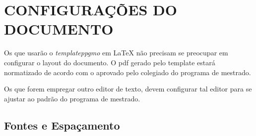 \documentclass{templateppgmo}
\numberwithin{figure}{chapter}
\numberwithin{table}{chapter}
\numberwithin{quadro}{chapter}
\numberwithin{algoritmo}{chapter}
\numberwithin{codigo}{chapter}
\begin{document}
\chapter{CONFIGURAÇÕES DO DOCUMENTO \label{capconfiguracoes}}

Os que usarão o \emph{templateppgmo} em \LaTeX\; não precisam se preocupar em configurar o layout do documento. O pdf gerado pelo template estará normatizado de acordo com o aprovado pelo colegiado do programa de mestrado.

Os que forem empregar outro editor de texto, devem configurar tal editor para se ajustar ao padrão do programa de mestrado.


\section{Fontes e Espaçamento}
\end{document}
